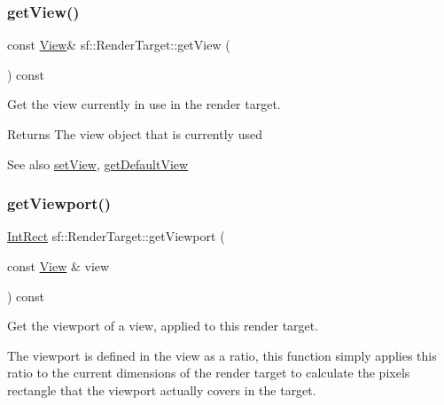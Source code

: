 \mbox{\label{classsf_1_1_render_target_a2c179503b4dcdf5282ef6426d317602c}} 
\subsubsection{\texorpdfstring{get\+View()}{getView()}}
{\footnotesize\ttfamily const \hyperlink{classsf_1_1_view}{View}\& sf\+::\+Render\+Target\+::get\+View (\begin{DoxyParamCaption}{ }\end{DoxyParamCaption}) const}



Get the view currently in use in the render target. 

\begin{DoxyReturn}{Returns}
The view object that is currently used
\end{DoxyReturn}
\begin{DoxySeeAlso}{See also}
\hyperlink{classsf_1_1_render_target_a063db6dd0a14913504af30e50cb6d946}{set\+View}, \hyperlink{classsf_1_1_render_target_ad3b533c3f899d7044d981ed607aef9be}{get\+Default\+View} 
\end{DoxySeeAlso}
\mbox{\label{classsf_1_1_render_target_a865d462915dc2a1fae2ebfb3300382ac}} 
\subsubsection{\texorpdfstring{get\+Viewport()}{getViewport()}}
{\footnotesize\ttfamily \hyperlink{classsf_1_1_rect}{Int\+Rect} sf\+::\+Render\+Target\+::get\+Viewport (\begin{DoxyParamCaption}\item[{const \hyperlink{classsf_1_1_view}{View} \&}]{view }\end{DoxyParamCaption}) const}



Get the viewport of a view, applied to this render target. 

The viewport is defined in the view as a ratio, this function simply applies this ratio to the current dimensions of the render target to calculate the pixels rectangle that the viewport actually covers in the target.


